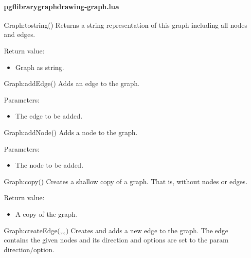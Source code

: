 
\paragraph{pgflibrarygraphdrawing-graph.lua}


\begin{luacommand}{{Graph:\textunderscore{}\textunderscore{}tostring}()}
Returns a string representation of this graph including all nodes and edges.


Return value:
\begin{itemize} \item[] Graph as string. \end{itemize}


\end{luacommand}\begin{luacommand}{{Graph:addEdge}()}
Adds an edge to the graph.

Parameters:
\begin{itemize}
	\item[]  \subitem The edge to be added.
\end{itemize}



\end{luacommand}\begin{luacommand}{{Graph:addNode}()}
Adds a node to the graph.

Parameters:
\begin{itemize}
	\item[]  \subitem The node to be added.
\end{itemize}



\end{luacommand}\begin{luacommand}{{Graph:copy}()}
Creates a shallow copy of a graph. That is, without nodes or edges.


Return value:
\begin{itemize} \item[] A copy of the graph. \end{itemize}


\end{luacommand}\begin{luacommand}{{Graph:createEdge}(,,,)}
Creates and adds a new edge to the graph. The edge contains the given nodes and its direction and options are set to the param direction/option.


\end{luacommand}
